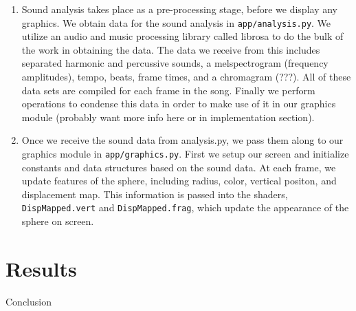\documentclass{article}
\newcommand{\code}{\texttt}
\begin{document}
\begin{enumerate}[(1)]

\item  Sound analysis takes place as a pre-processing stage, before we display any graphics. We obtain data for the sound analysis in \code{app/analysis.py}. We utilize an audio and music processing library called librosa to do the bulk of the work in obtaining the data. The data we receive from this includes separated harmonic and percussive sounds, a melspectrogram (frequency amplitudes), tempo, beats, frame times, and a chromagram (???). All of these data sets are compiled for each frame in the song. Finally we perform operations to condense this data in order to make use of it in our graphics module (probably want more info here or in implementation section).

\item Once we receive the sound data from analysis.py, we pass them along to our graphics module in \code{app/graphics.py}. First we setup our screen and initialize constants and data structures based on the sound data. At each frame, we update features of the sphere, including radius, color, vertical positon, and displacement map. This information is passed into the shaders, \code{DispMapped.vert} and \code{DispMapped.frag}, which update the appearance of the sphere on screen. 

\end{enumerate}

\section{Results}

Conclusion
\end{document}
